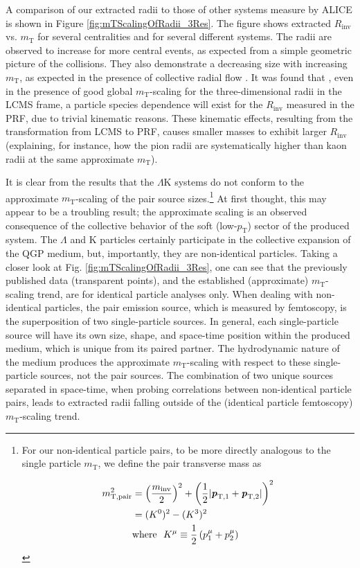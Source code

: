 \documentclass[ALICE,manyauthors]{cernphprep}
\newcommand{\mt}{$m_{\mathrm{T}}$\xspace}
\newcommand{\pt}{$p_{\mathrm{T}}$\xspace}
\newcommand{\Lam}{$\Lambda$\xspace}
\newcommand{\LamK}{$\Lambda$K\xspace}
\begin{document}
A comparison of our extracted radii to those of other systems measure by ALICE \cite{Adam:2015vja} is shown in Figure \ref{fig:mTScalingOfRadii_3Res}. 
The figure shows extracted $R_{\mathrm{inv}}$ vs. \mt for several centralities and for several different systems.
The radii are observed to increase for more central events, as expected from a simple geometric picture of the collisions.
They also demonstrate a decreasing size with increasing \mt, as expected in the presence of collective radial flow \cite{Akkelin:1995gh}.
It was found that \cite{Kisiel:2014upa}, even in the presence of good global \mt-scaling for the three-dimensional radii in the LCMS frame, a particle species dependence will exist for the $R_{\mathrm{inv}}$ measured in the PRF, due to trivial kinematic reasons.
These kinematic effects, resulting from the transformation from LCMS to PRF, causes smaller masses to exhibit larger $R_{\mathrm{inv}}$ \cite{Adam:2015vja} (explaining, for instance, how the pion radii are systematically higher than kaon radii at the same approximate \mt).



It is clear from the results that the \LamK systems do not conform to the approximate \mt-scaling of the pair source sizes.\footnote[1]
{
For our non-identical particle pairs, to be more directly analogous to the single particle \mt, we define the pair transverse mass as

\begin{equation*}
\begin{aligned}
 m_{\mathrm{T, pair}}^{2} &= \left( \frac{m_{\mathrm{inv}}}{2} \right)^{2} + \left( \frac{1}{2} |\textbf{\textit{p}}_{\mathrm{T,1}} + \textbf{\textit{p}}_{\mathrm{T,2}}| \right)^{2} \\
 &= (K^{0})^{2} - (K^{3})^{2} \\
 &\mathrm{where} ~~K^{\mu} \equiv \frac{1}{2} \left( p_{1}^{\mu} + p_{2}^{\mu} \right)
\end{aligned}
\label{eqn:PairmTv1}
\end{equation*}
}
At first thought, this may appear to be a troubling result; the approximate scaling is an observed consequence of the collective behavior of the soft (low-\pt) sector of the produced system.
The \Lam and K particles certainly participate in the collective expansion of the QGP medium, but, importantly, they are non-identical particles.
Taking a closer look at Fig. \ref{fig:mTScalingOfRadii_3Res}, one can see that the previously published data (transparent points), and the established (approximate) \mt-scaling trend, are for identical particle analyses only.
When dealing with non-identical particles, the pair emission source, which is measured by femtoscopy, is the superposition of two single-particle sources.
In general, each single-particle source will have its own size, shape, and space-time position within the produced medium, which is unique from its paired partner.
The hydrodynamic nature of the medium produces the approximate \mt-scaling with respect to these single-particle sources, not the pair sources.
The combination of two unique sources separated in space-time, when probing correlations between non-identical particle pairs, leads to extracted radii falling outside of the (identical particle femtoscopy) \mt-scaling trend.
\end{document}
